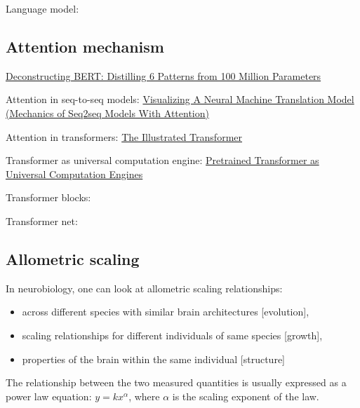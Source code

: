 \documentclass[12pt,a4paper]{article}
\begin{document}
Language model:


\subsection{Attention mechanism} 
\href{https://towardsdatascience.com/deconstructing-bert-distilling-6-patterns-from-100-million-parameters-b49113672f77}{Deconstructing BERT: Distilling 6 Patterns from 100 Million Parameters}

Attention in seq-to-seq models:
\href{https://jalammar.github.io/visualizing-neural-machine-translation-mechanics-of-seq2seq-models-with-attention/}{Visualizing A Neural Machine Translation Model (Mechanics of Seq2seq Models With Attention)}

Attention in transformers:
\href{https://jalammar.github.io/illustrated-transformer/}{The Illustrated Transformer} 

Transformer as universal computation engine: \href{https://www.youtube.com/watch?v=Elxn8rS88bI
Transformers as Universal over Domains}{Pretrained Transformer as Universal Computation Engines}

Transformer blocks:\\

Transformer net: \\




\subsection{Allometric scaling}
In neurobiology, one can look at allometric scaling relationships:
\begin{itemize}
    \item across different species with similar brain architectures [evolution],
    \item scaling relationships for different individuals of same species [growth],
    \item properties of the brain within the same individual [structure]
\end{itemize}

The relationship between the two measured quantities is usually expressed as a power law equation: $y=kx^\alpha$, where $\alpha$ is the scaling exponent of the law. 
\end{document}

